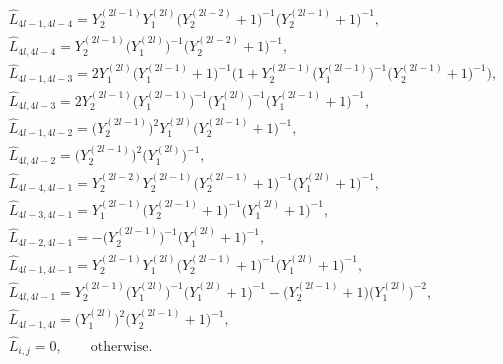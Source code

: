 \documentclass[pdftex]{sigma}
\numberwithin{equation}{section}
\begin{document}
	\begin{align*}
		&\hat{L}_{4l-1,4l-4}=Y_2^{(2l-1)}Y_1^{(2l)}\bigl(Y_2^{(2l-2)}+1\bigr)^{-1}\bigl(Y_2^{(2l-1)}+1\bigr)^{-1},\\
		&\hat{L}_{4l,4l-4}=Y_2^{(2l-1)}\bigl(Y_1^{(2l)}\bigr)^{-1}\bigl(Y_2^{(2l-2)}+1\bigr)^{-1},\\
		&\hat{L}_{4l-1,4l-3}=2Y_1^{(2l)}\bigl(Y_1^{(2l-1)}+1\bigr)^{-1}\bigl(1+Y_2^{(2l-1)}(Y_1^{(2l-1)}\bigr)^{-1}\bigl(Y_2^{(2l-1)}+1\bigr)^{-1}\bigr),\\
		&\hat{L}_{4l,4l-3}=2Y_2^{(2l-1)}\bigl(Y_1^{(2l-1)}\bigr)^{-1}\bigl(Y_1^{(2l)}\bigr)^{-1}\bigl(Y_1^{(2l-1)}+1\bigr)^{-1},\\
		&\hat{L}_{4l-1,4l-2}=\bigl(Y_2^{(2l-1)}\bigr)^2Y_1^{(2l)}\bigl(Y_2^{(2l-1)}+1\bigr)^{-1},\\
		&\hat{L}_{4l,4l-2}=\bigl(Y_2^{(2l-1)}\bigr)^2\bigl(Y_1^{(2l)}\bigr)^{-1},\\
		&\hat{L}_{4l-4,4l-1}=Y_2^{(2l-2)}Y_2^{(2l-1)}\bigl(Y_2^{(2l-1)}+1\bigr)^{-1}\bigl(Y_1^{(2l)}+1\bigr)^{-1},\\
		&\hat{L}_{4l-3,4l-1}=Y_1^{(2l-1)}\bigl(Y_2^{(2l-1)}+1\bigr)^{-1}\bigl(Y_1^{(2l)}+1\bigr)^{-1},\\
		&\hat{L}_{4l-2,4l-1}=-\bigl(Y_2^{(2l-1)}\bigr)^{-1}\bigl(Y_1^{(2l)}+1\bigr)^{-1},\\
		&\hat{L}_{4l-1,4l-1}=Y_2^{(2l-1)}Y_1^{(2l)}\bigl(Y_2^{(2l-1)}+1\bigr)^{-1}\bigl(Y_1^{(2l)}+1\bigr)^{-1},\\
		&\hat{L}_{4l,4l-1}=Y_2^{(2l-1)}\bigl(Y_1^{(2l)}\bigr)^{-1}\bigl(Y_1^{(2l)}+1\bigr)^{-1}-\bigl(Y_2^{(2l-1)}+1\bigr)\bigl(Y_1^{(2l)}\bigr)^{-2},\\
		&\hat{L}_{4l-1,4l}=\bigl(Y_1^{(2l)}\bigr)^2\bigl(Y_2^{(2l-1)}+1\bigr)^{-1},\\
		&\hat{L}_{i,j}=0,\qquad \text{otherwise}.
	\end{align*}
	
\end{document}
